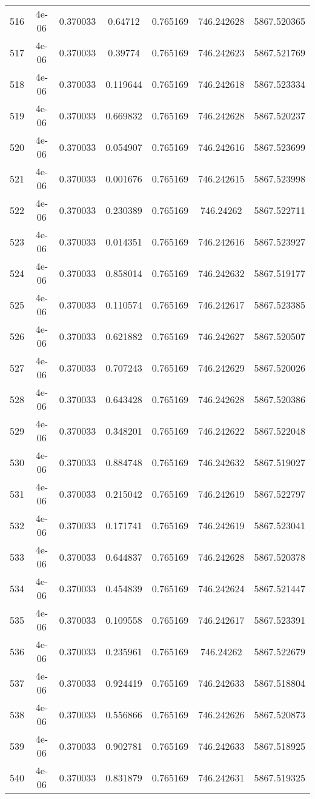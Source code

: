 \begin{table}
\begin{tabular*}{\linewidth}{c|c|c|c|c|c|c}
516 & 4e-06 & 0.370033 & 0.64712 & 0.765169 & 746.242628 & 5867.520365\\
517 & 4e-06 & 0.370033 & 0.39774 & 0.765169 & 746.242623 & 5867.521769\\
518 & 4e-06 & 0.370033 & 0.119644 & 0.765169 & 746.242618 & 5867.523334\\
519 & 4e-06 & 0.370033 & 0.669832 & 0.765169 & 746.242628 & 5867.520237\\
520 & 4e-06 & 0.370033 & 0.054907 & 0.765169 & 746.242616 & 5867.523699\\
521 & 4e-06 & 0.370033 & 0.001676 & 0.765169 & 746.242615 & 5867.523998\\
522 & 4e-06 & 0.370033 & 0.230389 & 0.765169 & 746.24262 & 5867.522711\\
523 & 4e-06 & 0.370033 & 0.014351 & 0.765169 & 746.242616 & 5867.523927\\
524 & 4e-06 & 0.370033 & 0.858014 & 0.765169 & 746.242632 & 5867.519177\\
525 & 4e-06 & 0.370033 & 0.110574 & 0.765169 & 746.242617 & 5867.523385\\
526 & 4e-06 & 0.370033 & 0.621882 & 0.765169 & 746.242627 & 5867.520507\\
527 & 4e-06 & 0.370033 & 0.707243 & 0.765169 & 746.242629 & 5867.520026\\
528 & 4e-06 & 0.370033 & 0.643428 & 0.765169 & 746.242628 & 5867.520386\\
529 & 4e-06 & 0.370033 & 0.348201 & 0.765169 & 746.242622 & 5867.522048\\
530 & 4e-06 & 0.370033 & 0.884748 & 0.765169 & 746.242632 & 5867.519027\\
531 & 4e-06 & 0.370033 & 0.215042 & 0.765169 & 746.242619 & 5867.522797\\
532 & 4e-06 & 0.370033 & 0.171741 & 0.765169 & 746.242619 & 5867.523041\\
533 & 4e-06 & 0.370033 & 0.644837 & 0.765169 & 746.242628 & 5867.520378\\
534 & 4e-06 & 0.370033 & 0.454839 & 0.765169 & 746.242624 & 5867.521447\\
535 & 4e-06 & 0.370033 & 0.109558 & 0.765169 & 746.242617 & 5867.523391\\
536 & 4e-06 & 0.370033 & 0.235961 & 0.765169 & 746.24262 & 5867.522679\\
537 & 4e-06 & 0.370033 & 0.924419 & 0.765169 & 746.242633 & 5867.518804\\
538 & 4e-06 & 0.370033 & 0.556866 & 0.765169 & 746.242626 & 5867.520873\\
539 & 4e-06 & 0.370033 & 0.902781 & 0.765169 & 746.242633 & 5867.518925\\
540 & 4e-06 & 0.370033 & 0.831879 & 0.765169 & 746.242631 & 5867.519325\\
\end{tabular*}
\end{table}
